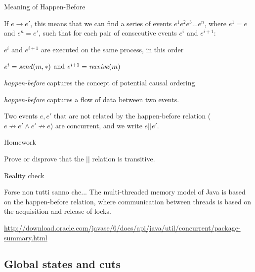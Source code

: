 \begin{frame}{Meaning of Happen-Before}

If $e \rightarrow e'$, this means that we can find a series of events
$e^1 e^2 e^3 \ldots e^n$, where $e^1 = e$ and $e^n = e'$, such that
for each pair of consecutive events $e^i$ and $e^{i+1}$:
\BE
\item $e^i$ and $e^{i+1}$ are executed on the same process, in this order
\item $e^i = \mathit{send}(m,*)$ and $e^{i+1} = \mathit{receive}(m)$
\EE

\bigskip
{}
\BIL
\item {\em happen-before} captures the concept of \alert{potential causal ordering}
\item {\em happen-before} captures a flow of data between two events.
\item Two events $e,e'$ that are not related by the happen-before relation 
  ($e \not\rightarrow e' \wedge e' \not\rightarrow e$) are \alert{concurrent},
  and we write $e || e'$.
\EIL

\end{frame}

\begin{frame}{Homework}


Prove or disprove that the $||$ relation is transitive.

\end{frame}



\begin{frame}{Reality check}

\begin{block}{Forse non tutti sanno che...}
The multi-threaded memory model of Java is based on the happen-before relation,
where communication between threads is based on the acquisition and release of
locks.

\bigskip
\url{http://download.oracle.com/javase/6/docs/api/java/util/concurrent/package-summary.html}
\end{block}

	
\end{frame}


\subsection{Global states and cuts}

